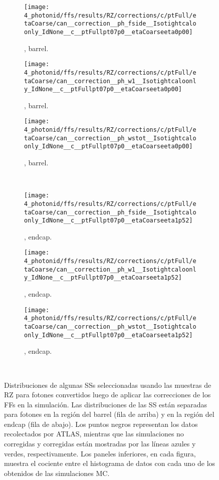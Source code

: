 \begin{figure}[ht!]
    \centering
    \begin{subfigure}[h]{0.32\linewidth}
        \centering
        \texttt{[image: 4\_photonid/ffs/results/RZ/corrections/c/ptFull/etaCoarse/can\_\_correction\_\_ph\_fside\_\_Isotightcaloonly\_IdNone\_\_c\_\_ptFullpt07p0\_\_etaCoarseeta0p00]}
        \caption{\fside, barrel.}
    \end{subfigure}
    \hfill
    \begin{subfigure}[h]{0.32\linewidth}
        \centering
        \texttt{[image: 4\_photonid/ffs/results/RZ/corrections/c/ptFull/etaCoarse/can\_\_correction\_\_ph\_w1\_\_Isotightcaloonly\_IdNone\_\_c\_\_ptFullpt07p0\_\_etaCoarseeta0p00]}
        \caption{\wone, barrel.}
    \end{subfigure}
    \hfill
    \begin{subfigure}[h]{0.32\linewidth}
        \centering
        \texttt{[image: 4\_photonid/ffs/results/RZ/corrections/c/ptFull/etaCoarse/can\_\_correction\_\_ph\_wstot\_\_Isotightcaloonly\_IdNone\_\_c\_\_ptFullpt07p0\_\_etaCoarseeta0p00]}
        \caption{\wstot, barrel.}
    \end{subfigure}\\
    \begin{subfigure}[h]{0.32\linewidth}
        \centering
        \texttt{[image: 4\_photonid/ffs/results/RZ/corrections/c/ptFull/etaCoarse/can\_\_correction\_\_ph\_fside\_\_Isotightcaloonly\_IdNone\_\_c\_\_ptFullpt07p0\_\_etaCoarseeta1p52]}
        \caption{\fside, endcap.}
    \end{subfigure}
    \hfill
    \begin{subfigure}[h]{0.32\linewidth}
        \centering
        \texttt{[image: 4\_photonid/ffs/results/RZ/corrections/c/ptFull/etaCoarse/can\_\_correction\_\_ph\_w1\_\_Isotightcaloonly\_IdNone\_\_c\_\_ptFullpt07p0\_\_etaCoarseeta1p52]}
        \caption{\wone, endcap.}
    \end{subfigure}
    \hfill
    \begin{subfigure}[h]{0.32\linewidth}
        \centering
        \texttt{[image: 4\_photonid/ffs/results/RZ/corrections/c/ptFull/etaCoarse/can\_\_correction\_\_ph\_wstot\_\_Isotightcaloonly\_IdNone\_\_c\_\_ptFullpt07p0\_\_etaCoarseeta1p52]}
        \caption{\wstot, endcap.}
    \end{subfigure}\\
    \caption{Distribuciones de algunas \acp{SS} seleccionadas usando las muestras de \ac{RZ} para fotones convertidos luego de aplicar las correcciones de los \acp{FF} en la simulaci\'on. Las distribuciones de las \ac{SS} est\'an separadas para fotones en la regi\'on del barrel (fila de arriba) y en la regi\'on del endcap (fila de abajo). Los puntos negros representan los datos recolectados por \ac{ATLAS}, mientras que las simulaciones no corregidas y corregidas est\'an mostradas por las l\'ineas azules y verdes, respectivamente. Los paneles inferiores, en cada figura, muestra el cociente entre el histograma de datos con cada uno de los obtenidos de las simulaciones \ac{MC}.}
    \label{fig:ss_corrections:ffs:results:ss_rz}
\end{figure}

